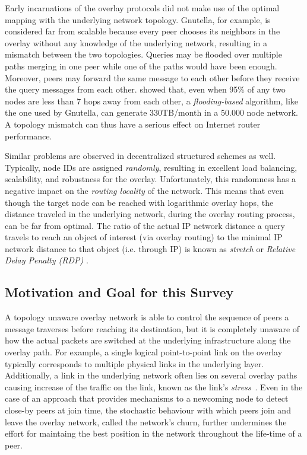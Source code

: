 Early incarnations of the overlay protocols did not make use of the optimal
mapping with the underlying network topology. Gnutella, for example, is
considered far from scalable \cite{ritter_gnucantscale_2001} because every peer
chooses its neighbors in the overlay without any knowledge of the underlying
network, resulting in a mismatch between the two topologies. Queries may be
flooded over multiple paths merging in one peer while one of the paths would
have been enough. Moreover, peers may forward the same message to each other
before they receive the query messages from each other.
\cite{matei_mapgnutella_2002} showed that, even when 95\% of any two nodes are
less than 7 hops away from each other, a \emph{flooding-based} algorithm, like
the one used by Gnutella, can generate 330TB/month in a 50.000 node network. A
topology mismatch can thus have a serious effect on Internet router performance.

Similar problems are observed in decentralized structured schemes as well.
Typically, node IDs are assigned \emph{randomly}, resulting in excellent load
balancing, scalability, and robustness for the overlay. Unfortunately, this
randomness has a negative impact on the \emph{routing locality} of the network.
This means that even though the target node can be reached with logarithmic
overlay hops, the distance traveled in the underlying network, during the
overlay routing process, can be far from optimal.  The ratio of the actual IP
network distance a query travels to reach an object of interest (via overlay
routing) to the minimal IP network distance to that object (i.e. through IP) is
known as \emph{stretch} or \emph{Relative Delay Penalty (RDP)} \cite{CRZ2000}.

\subsection{Motivation and Goal for this Survey}
A topology unaware overlay network is able to control the sequence of peers a
message traverses before reaching its destination, but it is completely unaware
of how the actual packets are switched at the underlying infrastructure along
the overlay path. For example, a single logical point-to-point link on the
overlay typically corresponds to multiple physical links in the
underlying layer. Additionally, a link in the underlying network often lies
on several overlay paths causing increase of the traffic on the
link, known as the link's \emph{stress}~\cite{CRSZ2002}. Even in the case
of an approach that provides mechanisms to a newcoming node to detect close-by
peers at join time, the stochastic behaviour with which peers join and leave
the overlay network, called the network's churn, further undermines the effort
for maintaing the best position in the network throughout the life-time of a
peer.

